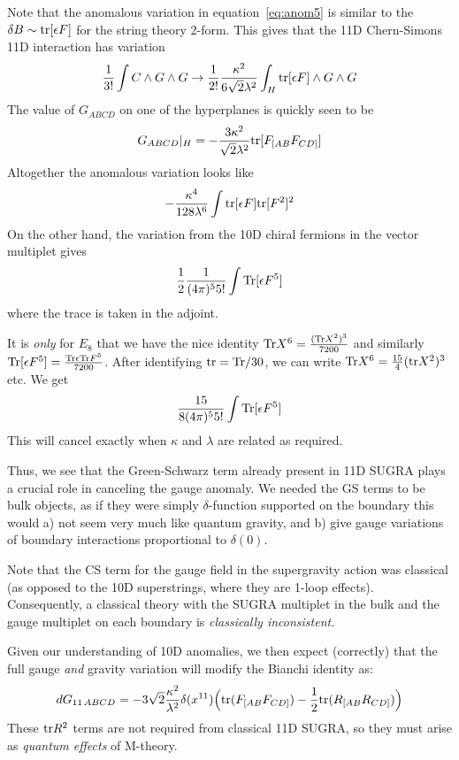 \documentclass[11pt, class=article, crop=false]{standalone}
\begin{document}
\begin{enumerate}
	 Note that the anomalous variation in equation~\eqref{eq:anom5} is similar to the $\delta B \sim \mathrm{tr} [\epsilon F]$ for the string theory 2-form. This gives that the 11D Chern-Simons 11D interaction has variation 
	 \[
	 	\frac{1}{3!} \int  C \wedge G \wedge G \to \frac{1}{2!} \frac{\kappa^2}{6\sqrt2 \lambda^2}  \int_{H} \mathrm{tr}[\epsilon F] \wedge G \wedge G
	 \]
	 The value of $G_{ABCD}$ on one of the hyperplanes is quickly seen to be 
	 \[
	 	G_{ABCD}|_H = -\frac{3 \kappa^2}{\sqrt{2}\lambda^2} \mathrm{tr}[ F_{[AB} F_{CD]}]
	 \]
	 Altogether the anomalous variation looks like
	 \[
	 	- \frac{\kappa^4}{128 \lambda^6} \int \mathrm{tr}[\epsilon F] \mathrm{tr} [F^2]^2
	 \]
	 On the other hand, the variation from the 10D chiral fermions in the vector multiplet gives
	 \[
	 	\frac12 \frac{1}{(4 \pi)^5 5!} \int \mathrm{Tr} [\epsilon F^5]
	 \]
	 where the trace is taken in the adjoint. 
	 
	 It is \emph{only} for $E_8$ that we have the nice identity $\mathrm{Tr} X^6 = \frac{(\mathrm{Tr} X^2)^3}{7200}$ and similarly $\mathrm{Tr}[\epsilon F^5] = \frac{\mathrm{Tr} \epsilon \mathrm{Tr} F^5}{7200}$. After identifying $\mathrm{tr} = \mathrm{Tr}/30$, we can write $\mathrm{Tr} X^6 = \frac{15}{4} (\mathrm{tr} X^2)^3$ etc. We get
	 \[
	 	\frac{15}{8 (4 \pi)^5 5!} \int \mathrm{Tr} [\epsilon F^5]
	 \]
	 This will cancel exactly when $\kappa$ and $\lambda$ are related as required. 
	 
	 Thus, we see that the Green-Schwarz term already present in 11D SUGRA plays a crucial role in canceling the gauge anomaly. We needed the GS terms to be bulk objects, as if they were simply $\delta$-function supported on the boundary this would a) not seem very much like quantum gravity, and b) give gauge variations of boundary interactions proportional to $\delta(0)$.
	 
	 Note that the CS term for the gauge field in the supergravity action was classical (as opposed to the 10D superstrings, where they are 1-loop effects). Consequently, a classical theory with the SUGRA multiplet in the bulk and the gauge multiplet on each boundary is \emph{classically inconsistent.}
	 
	 Given our understanding of 10D anomalies, we then expect (correctly) that the full gauge \emph{and} gravity variation will modify the Bianchi identity as:
	 \[
	 dG_{11 \, A B C D} = - 3 \sqrt2 \frac{\kappa^2}{\lambda^2} \delta(x^{11}) \Big(\mathrm{tr} (F_{[AB} F_{CD]}) - \frac12 \mathrm{tr} (R_{[AB} R_{CD]}) \Big)	
	 \]
	These $\mathrm{tr} R^2$ terms are not required from classical 11D SUGRA, so they must arise as \emph{quantum effects} of M-theory.
	 

\end{enumerate}
\end{document}
